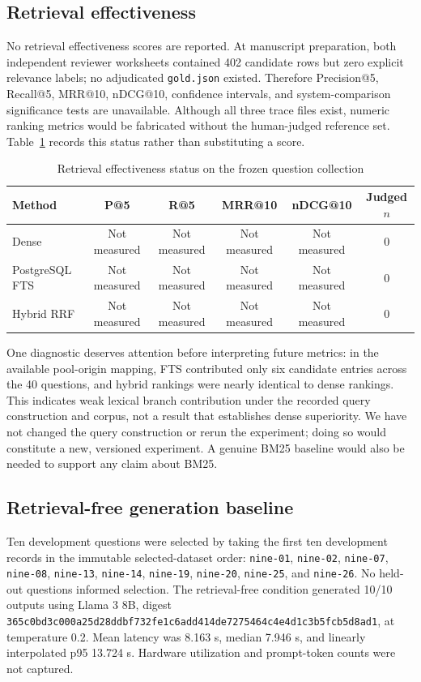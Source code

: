 \documentclass[conference]{IEEEtran}
\begin{document}
\subsection{Retrieval effectiveness}
No retrieval effectiveness scores are reported. At manuscript preparation, both independent reviewer worksheets contained 402 candidate rows but zero explicit relevance labels; no adjudicated \texttt{gold.json} existed. Therefore Precision@5, Recall@5, MRR@10, nDCG@10, confidence intervals, and system-comparison significance tests are unavailable. Although all three trace files exist, numeric ranking metrics would be fabricated without the human-judged reference set. Table~\ref{tab:retrieval-results} records this status rather than substituting a score.

\begin{table}[t]
\caption{Retrieval effectiveness status on the frozen question collection}
\label{tab:retrieval-results}
\centering\footnotesize
\begin{tabular}{lccccc}
\hline
Method & P@5 & R@5 & MRR@10 & nDCG@10 & Judged $n$\\ \hline
Dense & Not measured & Not measured & Not measured & Not measured & 0\\
PostgreSQL FTS & Not measured & Not measured & Not measured & Not measured & 0\\
Hybrid RRF & Not measured & Not measured & Not measured & Not measured & 0\\
\hline
\end{tabular}
\end{table}

One diagnostic deserves attention before interpreting future metrics: in the available pool-origin mapping, FTS contributed only six candidate entries across the 40 questions, and hybrid rankings were nearly identical to dense rankings. This indicates weak lexical branch contribution under the recorded query construction and corpus, not a result that establishes dense superiority. We have not changed the query construction or rerun the experiment; doing so would constitute a new, versioned experiment. A genuine BM25 baseline would also be needed to support any claim about BM25.

\subsection{Retrieval-free generation baseline}
Ten development questions were selected by taking the first ten development records in the immutable selected-dataset order: \texttt{nine-01}, \texttt{nine-02}, \texttt{nine-07}, \texttt{nine-08}, \texttt{nine-13}, \texttt{nine-14}, \texttt{nine-19}, \texttt{nine-20}, \texttt{nine-25}, and \texttt{nine-26}. No held-out questions informed selection. The retrieval-free condition generated 10/10 outputs using Llama 3 8B, digest \texttt{365c0bd3c000a25d28ddbf732fe1c6add414de7275464c4e4d1c3b5fcb5d8ad1}, at temperature 0.2. Mean latency was 8.163 s, median 7.946 s, and linearly interpolated p95 13.724 s. Hardware utilization and prompt-token counts were not captured.
\end{document}
